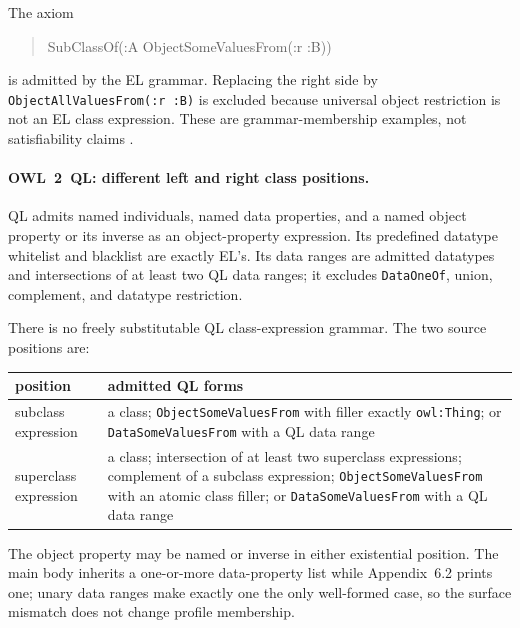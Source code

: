 The axiom
\begin{quote}\small\ttfamily
SubClassOf(:A ObjectSomeValuesFrom(:r :B))
\end{quote}
is admitted by the EL grammar.  Replacing the right side by
\texttt{ObjectAllValuesFrom(:r :B)} is excluded because universal object
restriction is not an EL class expression.  These are grammar-membership
examples, not satisfiability claims
\cite[\S\S2.2.3 and~2.2.6]{W3COWL2Profiles2012}.

\paragraph{OWL~2~QL: different left and right class positions.}
QL admits named individuals, named data properties, and a named object property
or its inverse as an object-property expression.  Its predefined datatype
whitelist and blacklist are exactly EL's.  Its data ranges are admitted
datatypes and intersections of at least two QL data ranges; it excludes
\texttt{DataOneOf}, union, complement, and datatype restriction.

There is no freely substitutable QL class-expression grammar.  The two source
positions are:
\begin{center}
\small
\begin{tabularx}{\textwidth}{@{}l X@{}}
\toprule
position & admitted QL forms\\
\midrule
subclass expression &
a class; \texttt{ObjectSomeValuesFrom} with filler exactly
\texttt{owl:Thing}; or \texttt{DataSomeValuesFrom} with a QL data range\\
superclass expression &
a class; intersection of at least two superclass expressions; complement of a
subclass expression; \texttt{ObjectSomeValuesFrom} with an atomic class filler;
or \texttt{DataSomeValuesFrom} with a QL data range\\
\bottomrule
\end{tabularx}
\end{center}
The object property may be named or inverse in either existential position.
The main body inherits a one-or-more data-property list while Appendix~6.2
prints one; unary data ranges make exactly one the only well-formed case, so
the surface mismatch does not change profile membership.

